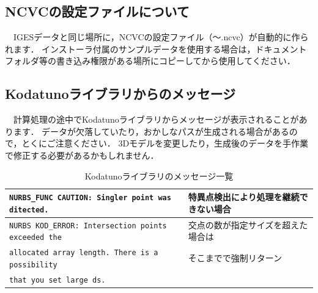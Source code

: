 \subsection{NCVCの設定ファイルについて}
　IGESデータと同じ場所に，NCVCの設定ファイル（～.ncvc）が自動的に作られます．
インストーラ付属のサンプルデータを使用する場合は，ドキュメントフォルダ等の書き込み権限がある場所にコピーしてから使用してください．

\subsection{Kodatunoライブラリからのメッセージ}
　計算処理の途中でKodatunoライブラリからメッセージが表示されることがあります．
データが欠落していたり，おかしなパスが生成される場合があるので，とくにご注意ください．
3Dモデルを変更したり，生成後のデータを手作業で修正する必要があるかもしれません．

\begin{table}[H]
\centering
\caption{Kodatunoライブラリのメッセージ一覧}
\label{tab:kodatuno_msg}
\begin{tabular}{l|l}
\hline
\texttt{NURBS\_FUNC CAUTION: Singler point was ditected.} & 特異点検出により処理を継続できない場合 \\ \hline
\texttt{NURBS KOD\_ERROR: Intersection points exceeded the} & 交点の数が指定サイズを超えた場合は \\
\texttt{allocated array length. There is a possibility} & そこまでで強制リターン \\
\texttt{that you set large ds.} & \\ \hline
\end{tabular}
\end{table}
